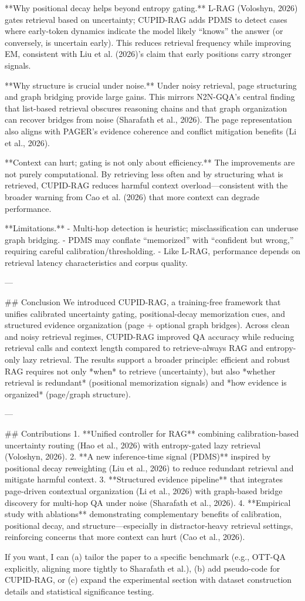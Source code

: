 **Why positional decay helps beyond entropy gating.** L-RAG (Voloshyn, 2026) gates retrieval based on uncertainty; CUPID-RAG adds PDMS to detect cases where early-token dynamics indicate the model likely “knows” the answer (or conversely, is uncertain early). This reduces retrieval frequency while improving EM, consistent with Liu et al. (2026)’s claim that early positions carry stronger signals.

**Why structure is crucial under noise.** Under noisy retrieval, page structuring and graph bridging provide large gains. This mirrors N2N-GQA’s central finding that list-based retrieval obscures reasoning chains and that graph organization can recover bridges from noise (Sharafath et al., 2026). The page representation also aligns with PAGER’s evidence coherence and conflict mitigation benefits (Li et al., 2026).

**Context can hurt; gating is not only about efficiency.** The improvements are not purely computational. By retrieving less often and by structuring what is retrieved, CUPID-RAG reduces harmful context overload—consistent with the broader warning from Cao et al. (2026) that more context can degrade performance.

**Limitations.**  
- Multi-hop detection is heuristic; misclassification can underuse graph bridging.  
- PDMS may conflate “memorized” with “confident but wrong,” requiring careful calibration/thresholding.  
- Like L-RAG, performance depends on retrieval latency characteristics and corpus quality.

---

## Conclusion  
We introduced CUPID-RAG, a training-free framework that unifies calibrated uncertainty gating, positional-decay memorization cues, and structured evidence organization (page + optional graph bridges). Across clean and noisy retrieval regimes, CUPID-RAG improved QA accuracy while reducing retrieval calls and context length compared to retrieve-always RAG and entropy-only lazy retrieval. The results support a broader principle: efficient and robust RAG requires not only *when* to retrieve (uncertainty), but also *whether retrieval is redundant* (positional memorization signals) and *how evidence is organized* (page/graph structure).

---

## Contributions  
1. **Unified controller for RAG** combining calibration-based uncertainty routing (Hao et al., 2026) with entropy-gated lazy retrieval (Voloshyn, 2026).  
2. **A new inference-time signal (PDMS)** inspired by positional decay reweighting (Liu et al., 2026) to reduce redundant retrieval and mitigate harmful context.  
3. **Structured evidence pipeline** that integrates page-driven contextual organization (Li et al., 2026) with graph-based bridge discovery for multi-hop QA under noise (Sharafath et al., 2026).  
4. **Empirical study with ablations** demonstrating complementary benefits of calibration, positional decay, and structure—especially in distractor-heavy retrieval settings, reinforcing concerns that more context can hurt (Cao et al., 2026).

If you want, I can (a) tailor the paper to a specific benchmark (e.g., OTT-QA explicitly, aligning more tightly to Sharafath et al.), (b) add pseudo-code for CUPID-RAG, or (c) expand the experimental section with dataset construction details and statistical significance testing.